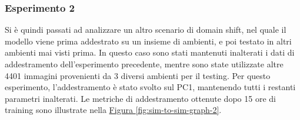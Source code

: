 \documentclass[12pt]{report}
\begin{document}
\subsubsection{Esperimento 2}
\label{sec:esperimento_ds_1_2}

Si è quindi passati ad analizzare un altro scenario di domain shift, nel quale il modello viene prima addestrato su un insieme di ambienti, e poi testato in altri ambienti mai visti prima. In questo caso sono stati mantenuti inalterati i dati di addestramento dell'esperimento precedente, mentre sono state utilizzate altre 4401 immagini provenienti da 3 diversi ambienti per il testing. Per questo esperimento, l'addestramento è stato svolto sul PC1, mantenendo tutti i restanti parametri inalterati. Le metriche di addestramento ottenute dopo 15 ore di training sono illustrate nella \hyperref[fig:sim-to-sim-graph-2]{Figura \ref{fig:sim-to-sim-graph-2}}.
\end{document}

